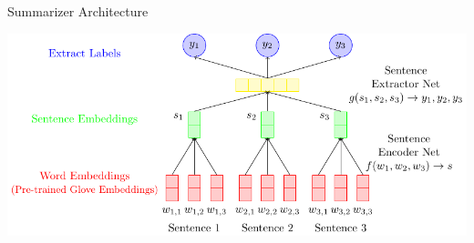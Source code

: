 \begin{frame}{Summarizer Architecture}
  \begin{center}
      \includegraphics[scale=.85]{3_deep_learning_models_of_salience/image_texs/arch/arch.pdf}
%
%
%      
%
  \end{center}
\end{frame}


